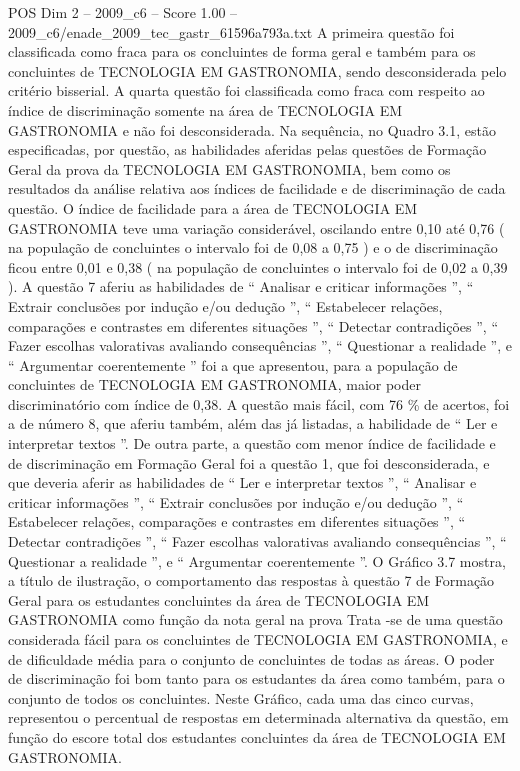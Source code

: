 \begin{textsample}{POS Dim 2 – 2009\_c6 – Score 1.00 – 2009\_c6/enade\_2009\_tec\_gastr\_61596a793a.txt}
A primeira questão foi classificada como fraca para os concluintes de forma geral e também para os concluintes de TECNOLOGIA EM GASTRONOMIA, sendo desconsiderada pelo critério bisserial.
A quarta questão foi classificada como fraca com respeito ao índice de discriminação somente na área de TECNOLOGIA EM GASTRONOMIA e não foi desconsiderada.
Na sequência, no Quadro 3.1, estão especificadas, por questão, as habilidades aferidas pelas questões de Formação Geral da prova da TECNOLOGIA EM GASTRONOMIA, bem como os resultados da análise relativa aos índices de facilidade e de discriminação de cada questão.
O índice de facilidade para a área de TECNOLOGIA EM GASTRONOMIA teve uma variação considerável, oscilando entre 0,10 até 0,76 ( na população de concluintes o intervalo foi de 0,08 a 0,75 ) e o de discriminação ficou entre 0,01 e 0,38 ( na população de concluintes o intervalo foi de 0,02 a 0,39 ).
A questão 7 aferiu as habilidades de “ Analisar e criticar informações ”, “ Extrair conclusões por indução e/ou dedução ”, “ Estabelecer relações, comparações e contrastes em diferentes situações ”, “ Detectar contradições ”, “ Fazer escolhas valorativas avaliando consequências ”, “ Questionar a realidade ”, e “ Argumentar coerentemente ” foi a que apresentou, para a população de concluintes de TECNOLOGIA EM GASTRONOMIA, maior poder discriminatório com índice de 0,38.
A questão mais fácil, com 76 \% de acertos, foi a de número 8, que aferiu também, além das já listadas, a habilidade de “ Ler e interpretar textos ”.
De outra parte, a questão com menor índice de facilidade e de discriminação em Formação Geral foi a questão 1, que foi desconsiderada, e que deveria aferir as habilidades de “ Ler e interpretar textos ”, “ Analisar e criticar informações ”, “ Extrair conclusões por indução e/ou dedução ”, “ Estabelecer relações, comparações e contrastes em diferentes situações ”, “ Detectar contradições ”, “ Fazer escolhas valorativas avaliando consequências ”, “ Questionar a realidade ”, e “ Argumentar coerentemente ”.
O Gráfico 3.7 mostra, a título de ilustração, o comportamento das respostas à questão 7 de Formação Geral para os estudantes concluintes da área de TECNOLOGIA EM GASTRONOMIA como função da nota geral na prova Trata -se de uma questão considerada fácil para os concluintes de TECNOLOGIA EM GASTRONOMIA, e de dificuldade média para o conjunto de concluintes de todas as áreas.
O poder de discriminação foi bom tanto para os estudantes da área como também, para o conjunto de todos os concluintes.
Neste Gráfico, cada uma das cinco curvas, representou o percentual de respostas em determinada alternativa da questão, em função do escore total dos estudantes concluintes da área de TECNOLOGIA EM GASTRONOMIA.

\end{textsample}
